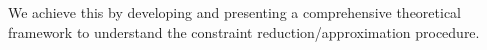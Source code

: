 We achieve this by developing and presenting a comprehensive theoretical framework to understand the constraint reduction/approximation procedure.\\
\begin{comment}
To put our contributions in perspective, we first discuss the merits and demerits of these two approaches.
\subsection{Projected Bellman Equation}
A large class of ADP methods compute $r^*$ to be the solution to the projected Bellman equation (PBE) given below:
\begin{align}\label{pbelong}
\Phi r^*=\Phi (\Phi ^\top D_u\Phi)^{-1}\Phi^\top T_u\Phi r^*,
\end{align}
where $T_u$ is the Bellman operator corresponding to an SDP $u$ and $D_u$ is a $n\times n$ diagonal matrix whose diagonal entries are the stationary probabilities of the states under the SDP $u$. The PBE can be written in short as 
\begin{align}\label{pbe}
\Phi r^*=\Pi T_u \Phi r^*,
\end{align} where $\Pi=\Phi (\Phi ^\top D_u\Phi)^{-1}\Phi^\top$ is the projection operator. Notice that approximate value function $\tj=\Phi r^*$ obtained by solving the PBE \eqref{pbe} is an approximation only to $J_u$ and not $J^*$. This scenario is unavoidable because $T_u$ cannot be replaced by $T$ in \eqref{pbe}, since $\Pi T$ cannot be guaranteed to be a contraction map. As a result, an equation of the form $\Phi r=\Pi T\Phi r$ need not have a solution. Thus, the PBE can only be used for approximate policy evaluation, i.e., to compute $\tilde{J}_u\approx J_u$. Nevertheless, the solution to the PBE offers error bounds for the prediction problem and is given below:
\begin{align}\label{errbnd}
||J_u-\Phi r^*||_D \leq \frac{1}{\sqrt{1-\alpha^2}}||J_u-\Pi J_u||_D.
\end{align}
In order to address the problem of control, one resorts to approximate policy improvement (API) wherein a one-step look ahead policy is derived. The API scheme is given in Algorithm~\ref{appoliter}
\begin{algorithm}
\caption{Approximate Policy Iteration (API)}
\begin{algorithmic}[1]
\STATE Start with any policy $u_0$
\FOR{$i=0,1,\ldots,n$} 
\STATE \label{appeval}Approximate policy evaluation $\tilde{J}_{i}= \Phi r^*_i$, where $\Phi r^*_i=\Pi T_{u_i}\Phi r^*_i$.

\end{comment}
